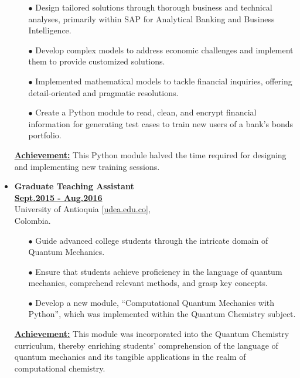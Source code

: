\begin{itemize}[leftmargin=5mm]
          \begin{itemize}[leftmargin=0mm]
              \small

              \item[$\bullet$] Design tailored solutions through thorough business and technical analyses, primarily within SAP for Analytical Banking and Business Intelligence.
              \item[$\bullet$] Develop complex models to address economic challenges and implement them to provide customized solutions.
              \item[$\bullet$] Implemented mathematical models to tackle financial inquiries, offering detail-oriented and pragmatic resolutions.
              \item[$\bullet$] Create a Python module to read, clean, and encrypt financial information for generating test cases to train new users of a bank's bonds portfolio.
          \end{itemize}

          \textbf{\href{.}{\underline{Achievement:}}}
          This Python module halved the time required for designing and implementing new training sessions.

    \item \textbf{\large Graduate Teaching Assistant}\\
          \href{.}{\bf Sept.2015 - Aug.2016}\\
          University of Antioquia [\href{www.udea.edu.co}{udea.edu.co}],\\
          Colombia.

          \begin{itemize}[leftmargin=0mm]
              \small

              \item[$\bullet$] Guide advanced college students through the intricate domain of Quantum Mechanics.
              \item[$\bullet$] Ensure that students achieve proficiency in the language of quantum mechanics, comprehend relevant methods, and grasp key concepts.
              \item[$\bullet$] Develop a new module, ``Computational Quantum Mechanics with Python'', which was implemented within the Quantum Chemistry subject.
          \end{itemize}

          \textbf{\href{.}{\underline{Achievement:}}}
          This module was incorporated into the Quantum Chemistry curriculum, thereby enriching students' comprehension of the language of quantum mechanics and its tangible applications in the realm of computational chemistry.

\end{itemize}
